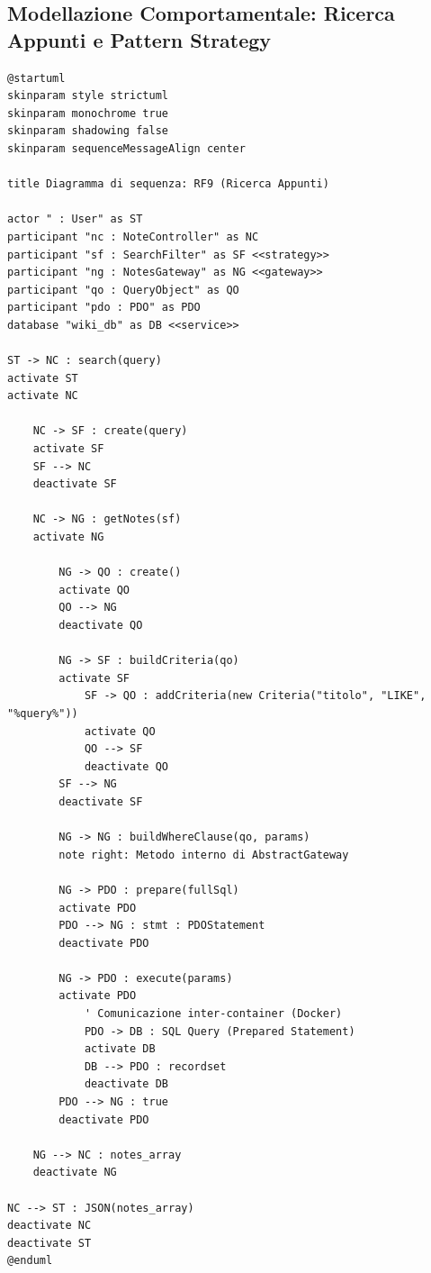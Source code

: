 \subsection{Modellazione Comportamentale: Ricerca Appunti e Pattern Strategy}



\begin{verbatim}
@startuml
skinparam style strictuml
skinparam monochrome true
skinparam shadowing false
skinparam sequenceMessageAlign center

title Diagramma di sequenza: RF9 (Ricerca Appunti)

actor " : User" as ST
participant "nc : NoteController" as NC
participant "sf : SearchFilter" as SF <<strategy>>
participant "ng : NotesGateway" as NG <<gateway>>
participant "qo : QueryObject" as QO
participant "pdo : PDO" as PDO
database "wiki_db" as DB <<service>>

ST -> NC : search(query)
activate ST
activate NC

    NC -> SF : create(query)
    activate SF
    SF --> NC
    deactivate SF
    
    NC -> NG : getNotes(sf)
    activate NG
        
        NG -> QO : create()
        activate QO
        QO --> NG
        deactivate QO
        
        NG -> SF : buildCriteria(qo)
        activate SF
            SF -> QO : addCriteria(new Criteria("titolo", "LIKE", "%query%"))
            activate QO
            QO --> SF
            deactivate QO
        SF --> NG
        deactivate SF
        
        NG -> NG : buildWhereClause(qo, params)
        note right: Metodo interno di AbstractGateway
        
        NG -> PDO : prepare(fullSql)
        activate PDO
        PDO --> NG : stmt : PDOStatement
        deactivate PDO
        
        NG -> PDO : execute(params)
        activate PDO
            ' Comunicazione inter-container (Docker)
            PDO -> DB : SQL Query (Prepared Statement)
            activate DB
            DB --> PDO : recordset
            deactivate DB
        PDO --> NG : true
        deactivate PDO
        
    NG --> NC : notes_array
    deactivate NG
    
NC --> ST : JSON(notes_array)
deactivate NC
deactivate ST
@enduml
\end{verbatim}